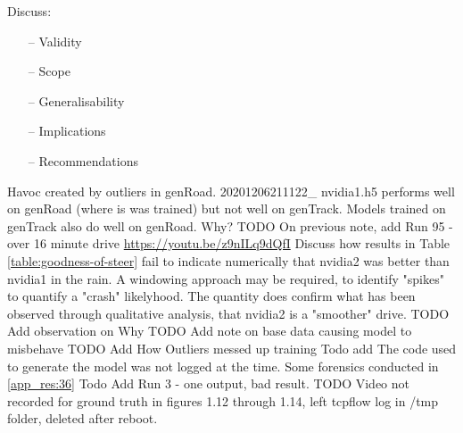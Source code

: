 


Discuss:
\begin{itemize}
    \item[--] Validity
    \item[--] Scope
    \item[--] Generalisability
    \item[--] Implications
    \item[--] Recommendations
\end{itemize}
Havoc created by outliers in genRoad. 20201206211122\_ nvidia1.h5 performs well on genRoad (where is was trained) but not well on genTrack. Models trained on genTrack also do well on genRoad. Why?
TODO On previous note, add Run 95 - over 16 minute drive \url{https://youtu.be/z9nILq9dQfI}  
Discuss how results in Table \ref{table:goodness-of-steer} fail to indicate numerically that nvidia2 was better than nvidia1 in the rain. A windowing approach may be required, to identify "spikes" to quantify a "crash" likelyhood. The quantity does confirm what has been observed through qualitative analysis, that nvidia2 is a "smoother" drive.  
TODO Add observation on Why
TODO Add note on base data causing model to misbehave
TODO Add How Outliers messed up training
Todo add The code used to generate the model was not logged at the time. Some forensics conducted in \ref{app_res:36}
Todo Add Run 3 - one output, bad result.
TODO Video not recorded for ground truth in figures 1.12 through 1.14, left tcpflow log in /tmp folder, deleted after reboot.

